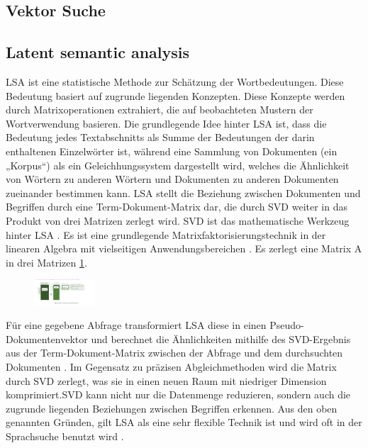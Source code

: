 
\subsection{Vektor Suche}

\subsection{Latent semantic analysis}
\ac{LSA} ist eine statistische Methode zur Schätzung der Wortbedeutungen. Diese Bedeutung basiert auf zugrunde liegenden Konzepten. Diese Konzepte werden durch Matrixoperationen extrahiert, die auf beobachteten Mustern der Wortverwendung basieren.
Die grundlegende Idee hinter LSA ist, dass die Bedeutung jedes Textabschnitts als Summe der Bedeutungen der darin enthaltenen Einzelwörter ist, 
während eine Sammlung von Dokumenten (ein „Korpus“) als ein Geleichhungssystem dargestellt wird, welches die Ähnlichkeit von Wörtern zu anderen Wörtern und Dokumenten zu anderen Dokumenten zueinander bestimmen kann.
LSA stellt die Beziehung zwischen Dokumenten und Begriffen durch eine Term-Dokument-Matrix dar, die durch \ac{SVD} weiter in das Produkt von drei Matrizen zerlegt wird. SVD ist das mathematische Werkzeug hinter LSA \cite{TheUseofLatentSemanticAnalysis}. Es ist eine grundlegende 
Matrixfaktorisierungstechnik in der linearen Algebra mit vielseitigen Anwendungsbereichen \cite{Paige1981Towards}. Es zerlegt eine Matrix A in drei Matrizen \ref{fig:SVD}.
\begin{figure}[h]
    \centering
    \includegraphics[width=0.2\textwidth]{../images/SVD.png}
    \label{fig:SVD}
\end{figure}
Für eine gegebene Abfrage transformiert LSA diese in einen Pseudo-Dokumentenvektor und berechnet die Ähnlichkeiten mithilfe des SVD-Ergebnis aus der Term-Dokument-Matrix zwischen der Abfrage und dem durchsuchten Dokumenten \cite{SystematicReviewofSemanticAnalysisMethods_2023} .
Im Gegensatz zu präzisen Abgleichmethoden wird die Matrix durch SVD zerlegt, was sie in einen neuen Raum mit niedriger Dimension komprimiert.SVD kann nicht nur die Datenmenge reduzieren, sondern auch die zugrunde liegenden Beziehungen zwischen Begriffen erkennen. 
Aus den oben genannten Gründen, gilt LSA als eine sehr flexible Technik ist und wird oft in der Sprachsuche benutzt wird \cite{TextMiningUsingLatentSemanticAnalysis} .

